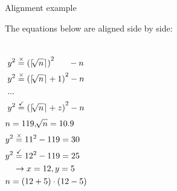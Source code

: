 \begin{frame}{Alignment example}

  The equations below are aligned side by side:
  
  \begin{columns}
    \begin{align*}
        &y^2 \stackrel{\times}{=}{(\lceil \sqrt[]{n} \rceil)}^2 \hphantom{+1)} -n \\ 
        &y^2 \stackrel{\times}{=}{(\lceil \sqrt[]{n} \rceil+1)}^2 -n \\
        &... \\
        &y^2  \stackrel{\checkmark}{=}{(\lceil \sqrt[]{n} \rceil+z)}^2 -n \\ 
    \end{align*}
    \begin{align*}
        & n = 119,\sqrt[]{n}=10.9 \\
        & y^2 \stackrel{\times}{=}{11}^2 -119 = 30  \\
        & y^2 \stackrel{\checkmark}{=}{12}^2 -119 = 25  \\
        & \hphantom{y^2}\rightarrow x=12, y = 5 \\
        & n=(12+5) \cdot (12-5) \\
    \end{align*}
  \end{columns}

\end{frame}